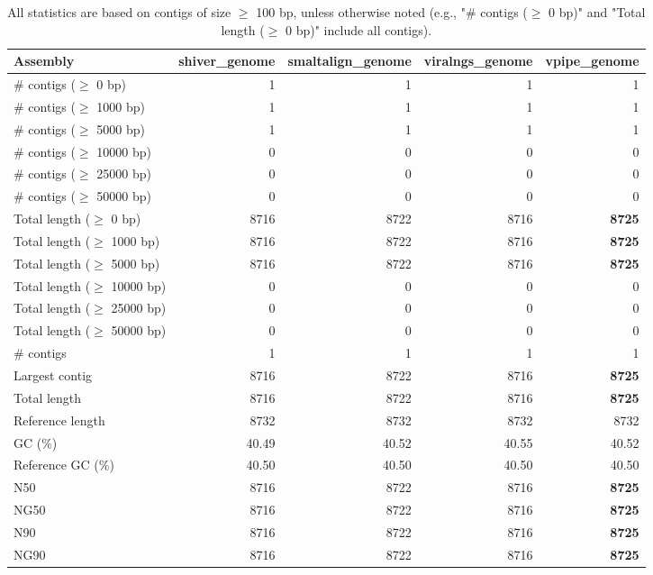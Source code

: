 \documentclass[12pt,a4paper]{article}
\begin{document}
\begin{table}[ht]
\begin{center}
\caption{All statistics are based on contigs of size $\geq$ 100 bp, unless otherwise noted (e.g., "\# contigs ($\geq$ 0 bp)" and "Total length ($\geq$ 0 bp)" include all contigs).}
\begin{tabular}{|l*{4}{|r}|}
\hline
Assembly & shiver\_genome & smaltalign\_genome & viralngs\_genome & vpipe\_genome \\ \hline
\# contigs ($\geq$ 0 bp) & 1 & 1 & 1 & 1 \\ \hline
\# contigs ($\geq$ 1000 bp) & 1 & 1 & 1 & 1 \\ \hline
\# contigs ($\geq$ 5000 bp) & 1 & 1 & 1 & 1 \\ \hline
\# contigs ($\geq$ 10000 bp) & 0 & 0 & 0 & 0 \\ \hline
\# contigs ($\geq$ 25000 bp) & 0 & 0 & 0 & 0 \\ \hline
\# contigs ($\geq$ 50000 bp) & 0 & 0 & 0 & 0 \\ \hline
Total length ($\geq$ 0 bp) & 8716 & 8722 & 8716 & {\bf 8725} \\ \hline
Total length ($\geq$ 1000 bp) & 8716 & 8722 & 8716 & {\bf 8725} \\ \hline
Total length ($\geq$ 5000 bp) & 8716 & 8722 & 8716 & {\bf 8725} \\ \hline
Total length ($\geq$ 10000 bp) & 0 & 0 & 0 & 0 \\ \hline
Total length ($\geq$ 25000 bp) & 0 & 0 & 0 & 0 \\ \hline
Total length ($\geq$ 50000 bp) & 0 & 0 & 0 & 0 \\ \hline
\# contigs & 1 & 1 & 1 & 1 \\ \hline
Largest contig & 8716 & 8722 & 8716 & {\bf 8725} \\ \hline
Total length & 8716 & 8722 & 8716 & {\bf 8725} \\ \hline
Reference length & 8732 & 8732 & 8732 & 8732 \\ \hline
GC (\%) & 40.49 & 40.52 & 40.55 & 40.52 \\ \hline
Reference GC (\%) & 40.50 & 40.50 & 40.50 & 40.50 \\ \hline
N50 & 8716 & 8722 & 8716 & {\bf 8725} \\ \hline
NG50 & 8716 & 8722 & 8716 & {\bf 8725} \\ \hline
N90 & 8716 & 8722 & 8716 & {\bf 8725} \\ \hline
NG90 & 8716 & 8722 & 8716 & {\bf 8725} \\ \hline

\end{tabular}
\end{center}
\end{table}
\end{document}
